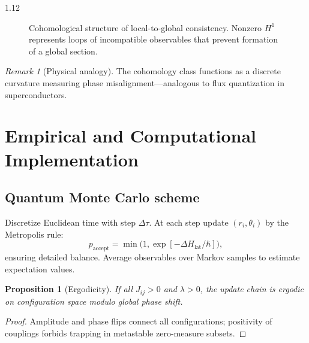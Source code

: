 \documentclass[12pt,a4paper]{article}
\numberwithin{equation}{section}
\newtheorem{proposition}{Proposition}[section]
\theoremstyle{remark}
\newtheorem{remark}{Remark}[section]
\theoremstyle{definition}
\begin{document}
\begin{spacing}{1.12}
\begin{figure}[H]
\centering
{}
\caption{Cohomological structure of local-to-global consistency.
Nonzero $H^1$ represents loops of incompatible observables
that prevent formation of a global section.}
\label{fig:cohomology}
\end{figure}

\begin{remark}[Physical analogy]
The cohomology class functions as a discrete curvature measuring
phase misalignment—analogous to flux quantization in superconductors.
\end{remark}

\section{Empirical and Computational Implementation}
\label{sec:empirical}

\subsection{Quantum Monte Carlo scheme}
\label{subsec:qmc}
Discretize Euclidean time with step $\Delta\tau$.
At each step update $(r_i,\theta_i)$ by the Metropolis rule:
\[
p_{\mathrm{accept}}
=\min\!\Big(1,
\exp\![-\Delta H_{\mathrm{lat}}/\hbar]\Big),
\]
ensuring detailed balance.
Average observables over Markov samples to estimate expectation values.

\begin{proposition}[Ergodicity]
If all $J_{ij}>0$ and $\lambda>0$,
the update chain is ergodic on configuration space modulo global phase shift.
\end{proposition}

\begin{proof}
Amplitude and phase flips connect all configurations;
positivity of couplings forbids trapping in metastable zero-measure subsets.
\end{proof}


\end{spacing}
\end{document}
